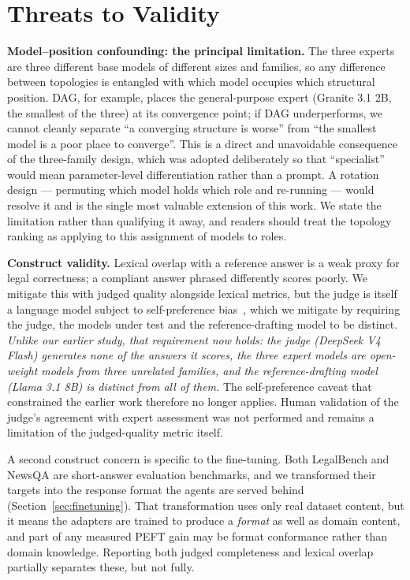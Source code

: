\documentclass[journal,10pt,compsoc,onecolumn]{IEEEtran}
\begin{document}
\section{Threats to Validity}
\label{sec:threats}

\textbf{Model--position confounding: the principal limitation.} The three experts
are three different base models of different sizes and families, so any difference
between topologies is entangled with which model occupies which structural
position. DAG, for example, places the general-purpose expert (Granite 3.1 2B, the
smallest of the three) at its convergence point; if DAG underperforms, we cannot
cleanly separate ``a converging structure is worse'' from ``the smallest model is
a poor place to converge''. This is a direct and unavoidable consequence of the
three-family design, which was adopted deliberately so that ``specialist'' would
mean parameter-level differentiation rather than a prompt. A rotation design ---
permuting which model holds which role and re-running --- would resolve it and is
the single most valuable extension of this work. We state the limitation rather
than qualifying it away, and readers should treat the topology ranking as
applying to this assignment of models to roles.

\textbf{Construct validity.} Lexical overlap with a reference answer is a weak
proxy for legal correctness; a compliant answer phrased differently scores
poorly. We mitigate this with judged quality alongside lexical metrics, but the
judge is itself a language model subject to self-preference
bias~\cite{wataoka2024selfpreference}, which we mitigate by requiring the judge,
the models under test and the reference-drafting model to be distinct.
\emph{Unlike our earlier study, that requirement now holds: the judge (DeepSeek V4
Flash) generates none of the answers it scores, the three expert models are
open-weight models from three unrelated families, and the reference-drafting model
(Llama 3.1 8B) is distinct from all of them.} The self-preference caveat that
constrained the earlier work therefore no longer applies. Human validation of the
judge's agreement with expert assessment was not performed and remains a
limitation of the judged-quality metric itself.

A second construct concern is specific to the fine-tuning. Both LegalBench and
NewsQA are short-answer evaluation benchmarks, and we transformed their targets
into the response format the agents are served behind
(Section~\ref{sec:finetuning}). That transformation uses only real dataset
content, but it means the adapters are trained to produce a \emph{format} as well
as domain content, and part of any measured PEFT gain may be format conformance
rather than domain knowledge. Reporting both judged completeness and lexical
overlap partially separates these, but not fully.
\end{document}
